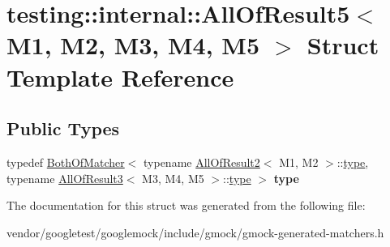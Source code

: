 \hypertarget{structtesting_1_1internal_1_1AllOfResult5}{}\section{testing\+:\+:internal\+:\+:All\+Of\+Result5$<$ M1, M2, M3, M4, M5 $>$ Struct Template Reference}
\label{structtesting_1_1internal_1_1AllOfResult5}
\subsection*{Public Types}
\begin{DoxyCompactItemize}
\item 
typedef \hyperlink{classtesting_1_1internal_1_1BothOfMatcher}{Both\+Of\+Matcher}$<$ typename \hyperlink{structtesting_1_1internal_1_1AllOfResult2}{All\+Of\+Result2}$<$ M1, M2 $>$\+::\hyperlink{classtesting_1_1internal_1_1BothOfMatcher}{type}, typename \hyperlink{structtesting_1_1internal_1_1AllOfResult3}{All\+Of\+Result3}$<$ M3, M4, M5 $>$\+::\hyperlink{classtesting_1_1internal_1_1BothOfMatcher}{type} $>$ {\bfseries type}\hypertarget{structtesting_1_1internal_1_1AllOfResult5_aee2e1fb803f428741d147347b692d108}{}\label{structtesting_1_1internal_1_1AllOfResult5_aee2e1fb803f428741d147347b692d108}

\end{DoxyCompactItemize}


The documentation for this struct was generated from the following file\+:\begin{DoxyCompactItemize}
\item 
vendor/googletest/googlemock/include/gmock/gmock-\/generated-\/matchers.\+h\end{DoxyCompactItemize}
